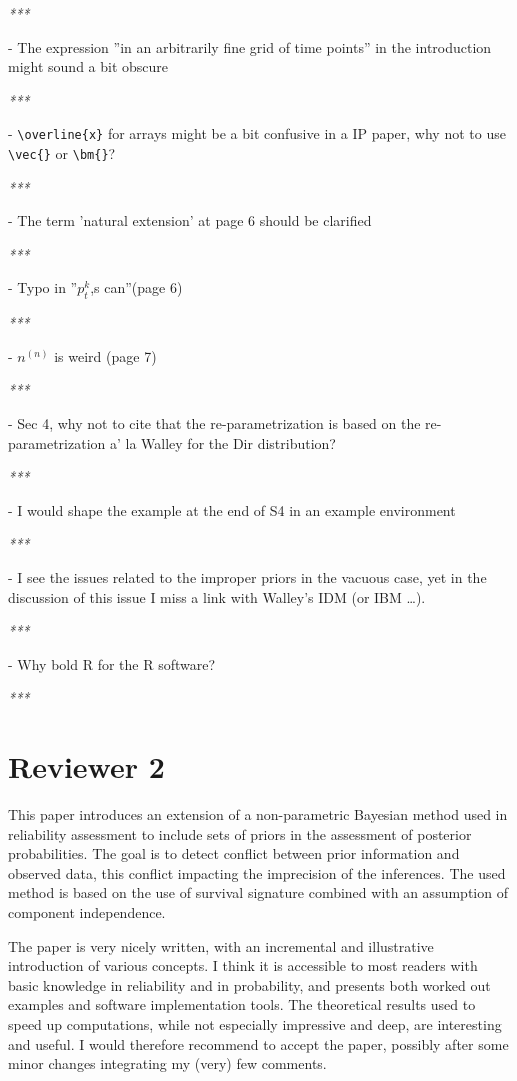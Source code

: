 \documentclass[12pt, a4paper]{elsarticle}
\newcommand{\bs}[1]{\boldsymbol{#1}}
\renewcommand{\vec}[1]{{\bs#1}}
\begin{document}
\medskip
\emph{***}
\medskip

- The expression ''in an arbitrarily fine grid of time points'' in the introduction might sound a bit obscure

\medskip
\emph{***}
\medskip

- \verb+\overline{x}+ for arrays might be a bit confusive in a IP paper, why not to use \verb+\vec{}+ or \verb+\bm{}+?

\medskip
\emph{***}
\medskip

- The term 'natural extension' at page 6 should be clarified

\medskip
\emph{***}
\medskip

- Typo in ''$p_t^k$,s can''(page 6)

\medskip
\emph{***}
\medskip

- $n^{(n)}$ is weird (page 7)

\medskip
\emph{***}
\medskip

- Sec 4, why not to cite that the re-parametrization is based on the re-parametrization a' la Walley for the Dir distribution?

\medskip
\emph{***}
\medskip

- I would shape the example at the end of S4 in an example environment

\medskip
\emph{***}
\medskip

- I see the issues related to the improper priors in the vacuous case, yet in the discussion of this issue I miss a link with Walley's IDM (or IBM …).

\medskip
\emph{***}
\medskip

- Why bold R for the R software?

\medskip
\emph{***}
\medskip


\section*{Reviewer 2}

This paper introduces an extension of a non-parametric Bayesian method used in reliability assessment to include sets of priors in the assessment of posterior probabilities. The goal is to detect conflict between prior information and observed data, this conflict impacting the imprecision of the inferences. The used method is based on the use of survival signature combined with an assumption of component independence.

The paper is very nicely written, with an incremental and illustrative introduction of various concepts. I think it is accessible to most readers with basic knowledge in reliability and in probability, and presents both worked out examples and software implementation tools. The theoretical results used to speed up computations, while not especially impressive and deep, are interesting and useful. I would therefore recommend to accept the paper, possibly after some minor changes integrating my (very) few comments.
\end{document}
